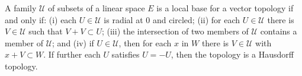 A family $\mathcal{U}$ of subsets of a linear space $E$ is a local base for a vector topology if and only if: (i) each $U \in \mathcal{U}$ is radial at $0$ and circled; (ii) for each $U \in \mathcal{U}$ there is $V \in \mathcal{U}$ such that $V + V \subset U$; (iii) the intersection of two members of $\mathcal{U}$ contains a member of $\mathcal{U}$; and (iv) if $U \in \mathcal{U}$, then for each $x$ in $W$ there is $V \in \mathcal{U}$ with $x + V \subset W$. If further each $U$ satisfies $U = -U$, then the topology is a Hausdorff topology.
